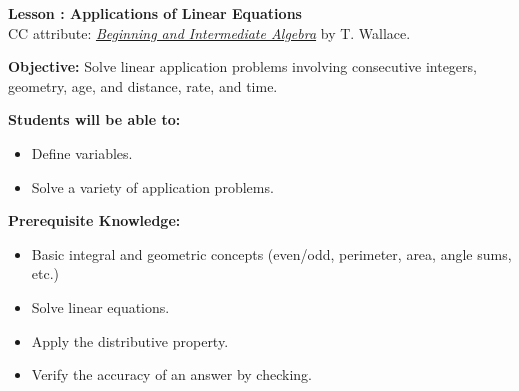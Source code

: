 \documentclass[12pt]{article}
\theoremstyle{definition}
\begin{document}
{\bf \large Lesson : Applications of Linear Equations}\\
CC attribute: \href{http://www.wallace.ccfaculty.org/book/book.html}{\it{Beginning and Intermediate Algebra}} by T. Wallace. \hfill \doclicenseImage[imagewidth=5em]\\
\par
{\bf Objective:} Solve linear application problems involving consecutive integers, geometry, age, and distance, rate, and time.\\
\par
{\bf Students will be able to:}
\begin{itemize}
	\item Define variables.
	\item Solve a variety of application problems.
\end{itemize}
{\bf Prerequisite Knowledge:}
\begin{itemize}
	\item Basic integral and geometric concepts (even/odd, perimeter, area, angle sums, etc.)
	\item Solve linear equations.
	\item Apply the distributive property.
	\item Verify the accuracy of an answer by checking.
\end{itemize}
\hrulefill
\end{document}
